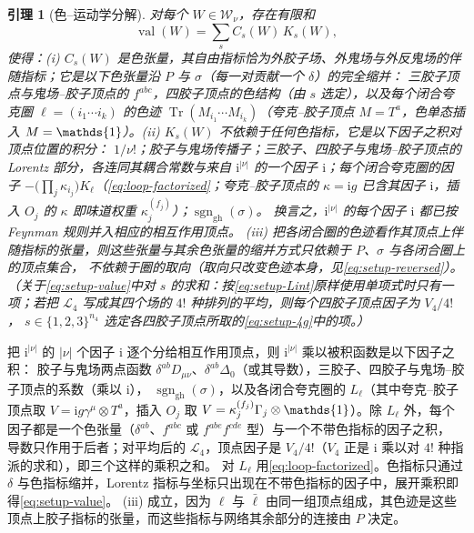 \documentclass[UTF8,a4paper,11pt,fontset=fandol]{ctexart}
\makeatletter
\let\amsmathbb\mathbb
\renewcommand{\mathbb}[1]{\ifx1#1\mathds{1}\else\amsmathbb{#1}\fi}
\theoremstyle{cplain}
\newtheorem{lemma}[theorem]{引理}
\theoremstyle{cdefinition}
\theoremstyle{cremark}
\renewcommand{\proofname}{证明}
\renewenvironment{proof}[1][\proofname]{\par\pushQED{\qed}\normalfont\topsep6\p@\@plus6\p@\relax
  \trivlist\item[\hskip\labelsep\itshape #1\hspace{0.5em}]\ignorespaces}{\popQED\endtrivlist\@endpefalse}
\numberwithin{equation}{section}
\DeclareMathOperator{\Tr}{Tr}
\newcommand{\ii}{\mathrm{i}}                        %
\makeatother
\begin{document}
\begin{lemma}[色--运动学分解]\label{lem:setup-factorization}
对每个 $W\in\mathcal W_\nu$，存在有限和
\begin{equation}\label{eq:setup-value}
\operatorname{val}(W)=\sum_{s}C_s(W)\,K_s(W),
\end{equation}
使得：(i) $C_s(W)$ 是色张量，其自由指标恰为外胶子场、外鬼场与外反鬼场的伴随指标；它是以下色张量沿 $P$ 与 $\sigma$（每一对贡献一个 $\delta$）的完全缩并：
三胶子顶点与鬼场--胶子顶点的 $f^{abc}$，四胶子顶点的色结构（由 $s$ 选定），以及每个闭合夸克圈 $\ell=(i_1\cdots i_k)$ 的色迹
$\Tr(M_{i_1}\cdots M_{i_k})$（夸克--胶子顶点 $M=T^a$，色单态插入 $M=\mathbb 1$）。(ii) $K_s(W)$ 不依赖于任何色指标，它是以下因子之积对顶点位置的积分：
$1/\nu!$；胶子与鬼场传播子；三胶子、四胶子与鬼场--胶子顶点的 Lorentz 部分，各连同其耦合常数与来自 $\ii^{|\nu|}$ 的一个因子 $\ii$；每个闭合夸克圈的因子
$-\bigl(\prod_j\kappa_{i_j}\bigr)K_\ell$（\cref{eq:loop-factorized}；夸克--胶子顶点的 $\kappa=\ii g$ 已含其因子 $\ii$，插入 $O_j$ 的 $\kappa$ 即味道权重 $\kappa_j^{(f_j)}$）；$\operatorname{sgn}_{\mathrm{gh}}(\sigma)$。
换言之，$\ii^{|\nu|}$ 的每个因子 $\ii$ 都已按 Feynman 规则并入相应的相互作用顶点。
(iii) 把各闭合圈的色迹看作其顶点上伴随指标的张量，则这些张量与其余色张量的缩并方式只依赖于 $P$、$\sigma$ 与各闭合圈上的顶点集合，
不依赖于圈的取向（取向只改变色迹本身，见\cref{eq:setup-reversed}）。
（关于\cref{eq:setup-value}中对 $s$ 的求和：按\cref{eq:setup-Lint}原样使用单项式时只有一项；若把 $\mathcal L_4$ 写成其四个场的 $4!$ 种排列的平均，则每个四胶子顶点因子为 $V_4/4!$，
$s\in\{1,2,3\}^{n_4}$ 选定各四胶子顶点所取的\cref{eq:setup-4g}中的项。）
\end{lemma}

\begin{proof}
把 $\ii^{|\nu|}$ 的 $|\nu|$ 个因子 $\ii$ 逐个分给相互作用顶点，则 $\ii^{|\nu|}$ 乘以被积函数是以下因子之积：
胶子与鬼场两点函数 $\delta^{ab}D_{\mu\nu}$、$\delta^{ab}\Delta_0$（或其导数），三胶子、四胶子与鬼场--胶子顶点的系数（乘以 $\ii$），
$\operatorname{sgn}_{\mathrm{gh}}(\sigma)$，以及各闭合夸克圈的 $L_\ell$（其中夸克--胶子顶点取 $V=\ii g\gamma^\mu\otimes T^a$，插入 $O_j$ 取 $V=\kappa_j^{(f_j)}\Gamma_j\otimes\mathbb 1$）。除 $L_\ell$ 外，每个因子都是一个色张量（$\delta^{ab}$、$f^{abc}$ 或 $f^{abe}f^{cde}$ 型）与一个不带色指标的因子之积，
导数只作用于后者；对平均后的 $\mathcal L_4$，顶点因子是 $V_4/4!$（$V_4$ 正是 $\ii$ 乘以对 $4!$ 种指派的求和），即三个这样的乘积之和。
对 $L_\ell$ 用\cref{eq:loop-factorized}。色指标只通过 $\delta$ 与色指标缩并，Lorentz 指标与坐标只出现在不带色指标的因子中，展开乘积即得\cref{eq:setup-value}。
(iii) 成立，因为 $\ell$ 与 $\bar\ell$ 由同一组顶点组成，其色迹是这些顶点上胶子指标的张量，而这些指标与网络其余部分的连接由 $P$ 决定。
\end{proof}
\end{document}
